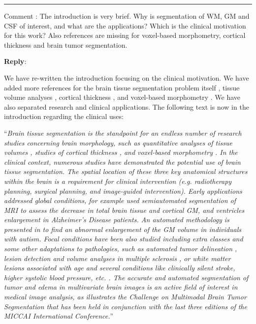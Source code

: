 \documentclass{memoir}
\newcounter{reviewpoint}
\newenvironment{reviewpoint}%
{\refstepcounter{reviewpoint}\par\medskip\vspace{3ex}\hrule\vspace{1.5ex}\par\noindent%
   {\fontseries{b}\selectfont Comment \arabic{reviewpoint}:} \fontshape{it}\selectfont }
{\label{com:\thereviewpoint}\par\medskip}
\newcommand{\reply}{\par\fontshape{n}\selectfont \noindent \textbf{Reply}:\ }
\begin{document}
\begin{reviewpoint}
The introduction is very brief. 
  Why is segmentation of WM, GM and CSF of interest, and what are the applications? 
  Which is the clinical motivation for this work? 
  Also references are missing for voxel-based morphometry, cortical thickness and brain tumor segmentation.
\reply{
We have re-written the introduction focusing on the clinical motivation.
We have added more references for the brain tissue segmentation problem itself 
\cite{kapur_segmentation_1996}, 
tissue volume analyses \cite{mortamet_effects_2005,abe_sex_2010,taki_correlations_2011},
cortical thickness \cite{fischl_measuring_2000,jones_three-dimensional_2000,macdonald_automated_2000}, and
voxel-based morphometry \cite{wright_voxel-based_1995,paus_structural_1999,good_voxel-based_2001,ge_age-related_2002}.
We have also separated research and clinical applications.
The following text is now in the introduction regarding the clinical uses: 

``\emph{Brain tissue segmentation is the standpoint for an endless
  number of research studies concerning brain morphology,
  such as quantitative analyses of tissue volumes 
  \citep{mortamet_effects_2005,abe_sex_2010,taki_correlations_2011},
  studies of cortical thickness \citep{fischl_measuring_2000,jones_three-dimensional_2000,
  macdonald_automated_2000}, and voxel-based morphometry
  \citep{wright_voxel-based_1995,paus_structural_1999,
  good_voxel-based_2001,ge_age-related_2002}.
In the clinical context, numerous studies have demonstrated the
  potential use of brain tissue segmentation.
The spatial location of these three key anatomical structures within
  the brain is a requirement for clinical intervention \citep{kikinis_digital_1996} 
  (e.g. radiotherapy planning, surgical planning, and image-guided intervention).
Early applications addressed global conditions, for example \citep{tanabe_tissue_1997}
  used semiautomated segmentation of MRI to assess the decrease in 
  total brain tissue and cortical GM, and ventricles enlargement in Alzheimer's
  Disease patients.
An automated methodology is presented in \citep{hazlett_cortical_2006}
  to find an abnormal enlargement of the GM volume in individuals
  with autism.
Focal conditions have been also studied including extra classes and
  some other adaptations to pathologies, such as automated tumor delineation
  \citep{prastawa_automatic_2003}, lesion detection and volume analyses
  in multiple sclerosis \citep{collins_automated_2001,
  zijdenbos_automatic_1998,zijdenbos_automatic_2002,van_leemput_automated_2001,
  van_leemput_unifying_2003}, or white matter lesions associated
  with age and several conditions like clinically silent stroke, higher
  systolic blood pressure, etc. \citep{anbeek_probabilistic_2004}.
The accurate and automated segmentation of tumor and
  edema in multivariate brain images is an active field of interest in medical
  image analysis, as illustrates the Challenge on \emph{Multimodal
  Brain Tumor Segmentation} \citep{menze_challenge_2013} that has been 
  held in conjunction with the last three editions of the 
  MICCAI International Conference.}''}
\end{reviewpoint}
\end{document}
